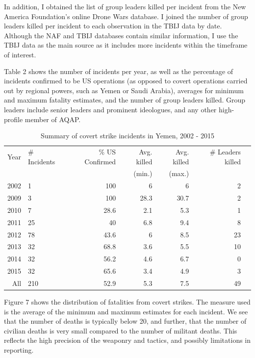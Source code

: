 \documentclass[letterpaper,12pt]{article}
\theoremstyle{definition}
\begin{document}
In addition, I obtained the list of group leaders killed per incident from the New America Foundation's online Drone Wars database. I joined the number of group leaders killed per incident to each observation in the TBIJ data by date. Although the NAF and TBIJ databases contain similar information, I use the TBIJ data as the main source as it includes more incidents within the timeframe of interest.

Table 2 shows the number of incidents per year, as well as the percentage of incidents confirmed to be US operations (as opposed to covert operations carried out by regional powers, such as Yemen or Saudi Arabia), averages for minimum and maximum fatality estimates, and the number of group leaders killed. Group leaders include senior leaders and prominent ideologues, and any other high-profile member of AQAP. 

\begin{table}[ht!]
\centering
\caption {Summary of covert strike incidents in Yemen, 2002 - 2015}
\begin{tabular}{rlrrrrr}
  \hline
Year & \# Incidents & \% US Confirmed & Avg. killed & Avg. killed & \# Leaders killed \\ 
& & & (min.) & (max.) &\\
  \hline
2002 &   1 & 100 & 6 & 6 & 2 \\ 
2009 &   3 & 100 & 28.3 & 30.7 & 2 \\ 
2010 &   7 & 28.6 & 2.1 & 5.3 & 1 \\ 
2011 &  25 & 40 & 6.8 & 9.4 & 8\\ 
2012 &  78 & 43.6 & 6 & 8.5 & 23 \\ 
2013 &  32 & 68.8 & 3.6 & 5.5 & 10 \\ 
2014 &  32 & 56.2 & 4.6 & 6.7 & 0 \\ 
2015 &  32 & 65.6 & 3.4 & 4.9 & 3 \\ 
  \hline
All & 210 & 52.9 & 5.3 & 7.5 & 49 \\ 
   \hline
\end{tabular}
\end{table}

Figure 7 shows the distribution of fatalities from covert strikes. The measure used is the average of the minimum and maximum estimates for each incident. We see that the number of deaths is typically below 20, and further, that the number of civilian deaths is very small compared to the number of militant deaths. This reflects the high precision of the weaponry and tactics, and possibly limitations in reporting.
\end{document}
